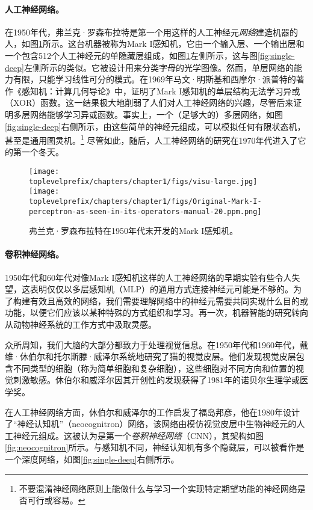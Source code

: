\documentclass[../../book-main.tex]{subfiles}
\begin{document}
\paragraph{人工神经网络。}
在1950年代，弗兰克·罗森布拉特是第一个用这样的人工神经元{\em 网络}建造机器的人，如图\ref{fig:perceptron}所示。这台机器被称为Mark I感知机，它由一个输入层、一个输出层和一个包含512个人工神经元的单隐藏层组成，如图\ref{fig:perceptron}左侧所示，这与图\ref{fig:single-deep}左侧所示的类似。它被设计用来分类字母的光学图像。然而，单层网络的能力有限，只能学习线性可分的模式。在1969年马文·明斯基和西摩尔·派普特的著作《感知机：计算几何导论》\cite{Minsky-1969}中，证明了Mark I感知机的单层结构无法学习异或（XOR）函数。这一结果极大地削弱了人们对人工神经网络的兴趣，尽管后来证明多层网络能够学习异或函数\cite{Rumelhart1986}。事实上，一个（足够大的）多层网络，如图\ref{fig:single-deep}右侧所示，由这些简单的神经元组成，可以模拟任何有限状态机，甚至是通用图灵机。\footnote{不要混淆神经网络原则上能做什么与学习一个实现特定期望功能的神经网络是否可行或容易。} 尽管如此，随后，人工神经网络的研究在1970年代进入了它的第一个冬天。

\begin{figure}
    \centering
    \texttt{[image: \\toplevelprefix/chapters/chapter1/figs/visu-large.jpg]}
    \hspace{2mm} \texttt{[image: \\toplevelprefix/chapters/chapter1/figs/Original-Mark-I-perceptron-as-seen-in-its-operators-manual-20.ppm.png]}
    \caption{弗兰克·罗森布拉特在1950年代末开发的Mark I感知机。}
    \label{fig:perceptron}
\end{figure}


\paragraph{卷积神经网络。}
1950年代和60年代对像Mark I感知机这样的人工神经网络的早期实验有些令人失望，这表明仅仅以多层感知机（MLP）的通用方式连接神经元可能是不够的。为了构建有效且高效的网络，我们需要理解网络中的神经元需要共同实现什么目的或功能，以便它们应该以某种特殊的方式组织和学习。再一次，机器智能的研究转向从动物神经系统的工作方式中汲取灵感。

众所周知，我们大脑的大部分都致力于处理视觉信息。在1950年代和1960年代，戴维·休伯尔和托尔斯滕·威泽尔系统地研究了猫的视觉皮层。他们发现视觉皮层包含不同类型的细胞（称为简单细胞和复杂细胞），这些细胞对不同方向和位置的视觉刺激敏感\cite{Hubel-Wiesel-1959}。休伯尔和威泽尔因其开创性的发现获得了1981年的诺贝尔生理学或医学奖。


在人工神经网络方面，休伯尔和威泽尔的工作启发了福岛邦彦，他在1980年设计了“神经认知机”（neocognitron）网络，该网络由模仿视觉皮层中生物神经元的人工神经元组成\cite{Fukushima1980NeocognitronAS}。这被认为是第一个{\em 卷积神经网络}（CNN），其架构如图\ref{fig:neocognitron}所示。与感知机不同，神经认知机有多个隐藏层，可以被看作是一个深度网络，如图\ref{fig:single-deep}右侧所示。
\end{document}
